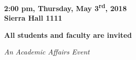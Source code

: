 \documentclass{article}
\begin{document}
\hfill\break

\begin{center}

\LARGE
{\bf 2:00 pm, Thursday, May 3\textsuperscript{rd}, 2018\\
Sierra Hall 1111}\\

\vspace{15mm}

\large
{\bf All students and faculty are invited}\\

\hfill\break

\small
{\it An Academic Affairs Event}

\end{center}
\end{document}
